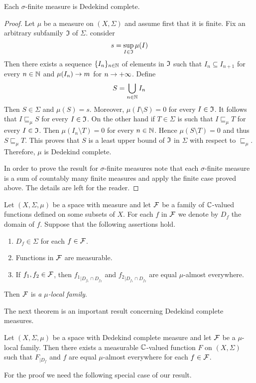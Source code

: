 \begin{proposition}\label{proposition:sigma_finite_measure_spaces_are_Dedekind_complete}
Each $\sigma$-finite measure is Dedekind complete.
\end{proposition}
\begin{proof}
  Let $\mu$ be a measure on $(X,\Sigma)$ and assume first that it is finite. Fix an arbitrary subfamily ${\mathfrak I}$ of $\Sigma$. consider
  $$s = \sup_{I\in {\mathfrak I}}\mu(I)$$
  Then there exists a sequence $\{I_n\}_{n\in {\mathbb N}}$ of elements in ${\mathfrak I}$ such that $I_{n} \subseteq I_{n+1}$ for every $n\in {\mathbb N}$ and $\mu(I_n) \rightarrow m$ for $n \rightarrow +\infty$. Define
  $$S = \bigcup_{n\in {\mathbb N}}I_n$$
  Then $S \in \Sigma$ and $\mu(S) = s$. Moreover, $\mu(I\setminus S) = 0$ for every $I \in {\mathfrak I}$. It follows that $I \sqsubseteq_{\mu}S$ for every $I \in {\mathfrak I}$. On the other hand if $T \in \Sigma$ is such that $I \sqsubseteq_{\mu} T$ for every $I \in {\mathfrak I}$. Then $\mu(I_n \setminus T) = 0$ for every $n \in {\mathbb N}$. Hence $\mu(S\setminus T) = 0$ and thus $S\sqsubseteq_{\mu} T$. This proves that $S$ is a least upper bound of ${\mathfrak I}$ in $\Sigma$ with respect to $\sqsubseteq_{\mu}$. Therefore, $\mu$ is Dedekind complete.

  In order to prove the result for $\sigma$-finite measures note that each $\sigma$-finite measure is a sum of countably many finite measures and apply the finite case proved above. The details are left for the reader.  
\end{proof}

\begin{definition}
  Let $(X,\Sigma,\mu)$ be a space with measure and let ${\mathcal F}$ be a family of ${\mathbb C}$-valued functions defined on some subsets of $X$. For each $f$ in ${\mathcal F}$ we denote by $D_f$ the domain of $f$. Suppose that the following assertions hold.
  \begin{enumerate}[label=\textbf{(\arabic*)}, leftmargin=*]
    \item $D_f \in \Sigma$ for each $f\in {\mathcal F}$.
    \item Functions in ${\mathcal F}$ are measurable.
    \item If $f_1,f_2 \in {\mathcal F}$, then ${f_1}_{\mid D_{f_1}\cap D_{f_2}}$ and ${f_2}_{\mid D_{f_1}\cap D_{f_2}}$ are equal $\mu$-almost everywhere.
  \end{enumerate}
  Then ${\mathcal F}$ is \textit{a $\mu$-local family}.
\end{definition}
\noindent
The next theorem is an important result concerning Dedekind complete measures.

\begin{theorem}\label{theorem:Dedekind_complete_local_families_can_be_glued}
  Let $(X,\Sigma,\mu)$ be a space with Dedekind complete measure and let ${\mathcal F}$ be a $\mu$-local family. Then there exists a measurable ${\mathbb C}$-valued function $F$ on $(X,\Sigma)$ such that $F_{\mid D_f}$ and $f$ are equal $\mu$-almost everywhere for each $f \in {\mathcal F}$.
\end{theorem}
\noindent
For the proof we need the following special case of our result.

